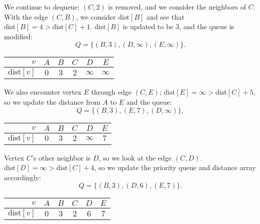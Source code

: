 \documentclass[11pt]{article}
\begin{document}
We continue to dequeue: $(C, 2)$ is removed, and we consider the neighbors of $C$. With the edge $(C, B)$, we consider $\text{dist}[B]$ and see that $\text{dist}[B] = 4 > \text{dist}[C] + 1$. $\text{dist}[B]$ is updated to be $3$, and the queue is modified:
\begin{equation*}
    Q = \{(B, 3), (D, \infty), (E, \infty)\}.
\end{equation*}
\begin{center}
    \begin{tabular}{|r|ccccc|}
        \hline 
        $v$ & $A$ & $B$ & $C$ & $D$ & $E$ \\ \hline 
        $\text{dist}[v]$ & $0$ & $3$ & $2$ & $\infty$ & $\infty$ \\ \hline 
    \end{tabular}
\end{center}
We also encounter vertex $E$ through edge $(C, E)$; $\text{dist}[E] = \infty > \text{dist}[C] + 5$, so we update the distance from $A$ to $E$ and the queue:
\begin{equation*}
    Q = \{(B, 3), (E, 7), (D, \infty)\},
\end{equation*}
\begin{center}
    \begin{tabular}{|r|ccccc|}
        \hline 
        $v$ & $A$ & $B$ & $C$ & $D$ & $E$ \\ \hline 
        $\text{dist}[v]$ & $0$ & $3$ & $2$ & $\infty$ & $7$ \\ \hline 
    \end{tabular}
\end{center}

Vertex $C$'s other neighbor is $D$, so we look at the edge $(C, D)$. $\text{dist}[D] = \infty > \text{dist}[C] + 4$, so we update the priority queue and distance array accordingly:
\begin{equation*}
    Q = \{(B, 3), (D, 6), (E, 7)\}.
\end{equation*}
\begin{center}
    \begin{tabular}{|r|ccccc|}
        \hline 
        $v$ & $A$ & $B$ & $C$ & $D$ & $E$ \\ \hline 
        $\text{dist}[v]$ & $0$ & $3$ & $2$ & $6$ & $7$ \\ \hline 
    \end{tabular}
\end{center}
\end{document}
